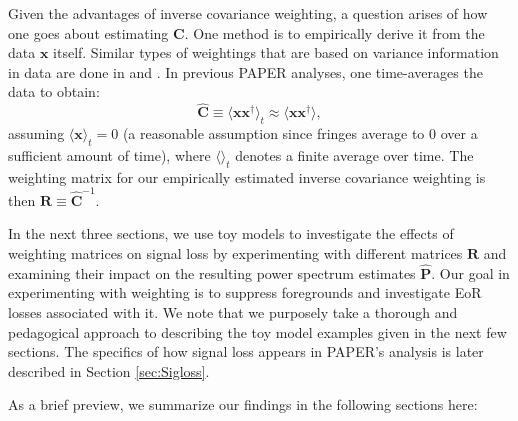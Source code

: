 \documentclass[preprint2,numberedappendix,tighten]{aastex6}  %
\newcommand{\C}{\mathbf{C}}
\begin{document}
Given the advantages of inverse covariance weighting, a question arises of how one goes about estimating $\C$.  One method is to empirically derive it from the data $\textbf{x}$ itself.
Similar types of weightings that are based on variance information in data are done in \citet{chang_et_al2010} and \citet{switzer_et_al2015}. In previous PAPER analyses, one time-averages the data to obtain:
\begin{equation}
\widehat{\textbf{C}} \equiv \langle\textbf{xx}^{\dagger}\rangle_{t} \approx \langle  \textbf{xx}^{\dagger}\rangle,
\end{equation}
assuming $\langle\textbf{x}\rangle_{t} = 0$ (a reasonable assumption since fringes average to $0$ over a sufficient 
amount of time), where $\langle \rangle_{t}$ denotes a finite average over time. The weighting matrix for our empirically estimated inverse covariance weighting is then $
\textbf{R} \equiv \widehat{\textbf{C}}^{-1}$.

In the next three sections, we use toy models to investigate the effects of weighting matrices on signal loss by experimenting with different matrices $\textbf{R}$ and examining their impact on the resulting power spectrum estimates $\widehat{\textbf{P}}$. Our goal in experimenting with weighting is to suppress foregrounds and investigate EoR losses associated with it. We note that we purposely take a thorough and pedagogical approach to describing the toy model examples given in the next few sections. The specifics of how signal loss appears in PAPER's analysis is later described in Section \ref{sec:Sigloss}.


As a brief preview, we summarize our findings in the following sections here:
\end{document}
